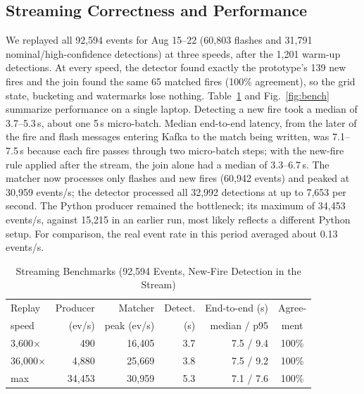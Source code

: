 \documentclass[10pt,journal,compsoc]{IEEEtran}
\begin{document}
\subsection{Streaming Correctness and Performance}
We replayed all 92,594 events for Aug 15--22 (60,803 flashes and 31,791 nominal/high-confidence detections) at three speeds, after the 1,201 warm-up detections. At every speed, the detector found exactly the prototype's 139 new fires and the join found the same 65 matched fires (100\% agreement), so the grid state, bucketing and watermarks lose nothing. Table~\ref{tab:bench} and Fig.~\ref{fig:bench} summarize performance on a single laptop. Detecting a new fire took a median of 3.7--5.3\,s, about one 5\,s micro-batch. Median end-to-end latency, from the later of the fire and flash messages entering Kafka to the match being written, was 7.1--7.5\,s because each fire passes through two micro-batch steps; with the new-fire rule applied after the stream, the join alone had a median of 3.3--6.7\,s. The matcher now processes only flashes and new fires (60,942 events) and peaked at 30,959 events/s; the detector processed all 32,992 detections at up to 7,653 per second. The Python producer remained the bottleneck; its maximum of 34,453 events/s, against 15,215 in an earlier run, most likely reflects a different Python setup. For comparison, the real event rate in this period averaged about 0.13 events/s.

\begin{table}[!t]
\caption{Streaming Benchmarks (92,594 Events, New-Fire Detection in the Stream)}
\label{tab:bench}
\centering
\footnotesize
\setlength{\tabcolsep}{2.5pt}
\begin{tabular}{@{}lrrrrc@{}}
\toprule
Replay & Producer & Matcher & Detect. & End-to-end (s) & Agree- \\
speed & (ev/s) & peak (ev/s) & (s) & median / p95 & ment \\
\midrule
3,600$\times$ & 490 & 16,405 & 3.7 & 7.5 / 9.4 & 100\% \\
36,000$\times$ & 4,880 & 25,669 & 3.8 & 7.5 / 9.2 & 100\% \\
max & 34,453 & 30,959 & 5.3 & 7.1 / 7.6 & 100\% \\
\bottomrule
\end{tabular}
\end{table}
\end{document}
